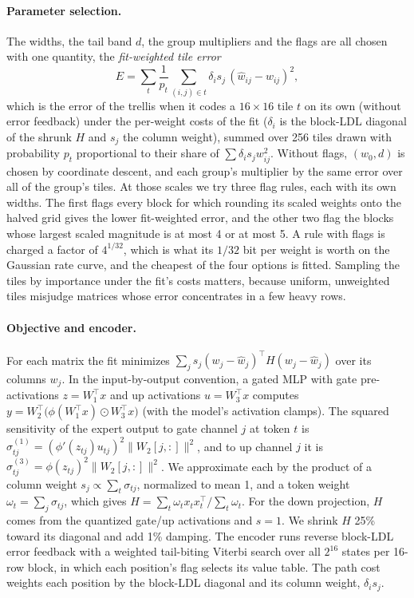 \paragraph{Parameter selection.} The widths, the tail band $d$, the group multipliers and the flags are all chosen
with one quantity, the \emph{fit-weighted tile error}
\begin{equation*}
E=\sum_{t}\frac{1}{p_t}\sum_{(i,j)\in t} \delta_i s_j\,(\hat w_{ij}-w_{ij})^2 ,
\end{equation*}
which is the error of the trellis when it codes a $16\times16$ tile $t$ on its own (without error feedback) under the
per-weight costs of the fit ($\delta_i$ is the block-LDL diagonal of the shrunk $H$ and $s_j$ the column weight),
summed over 256 tiles drawn with probability $p_t$ proportional to their share of $\sum\delta_i s_j w_{ij}^2$. Without
flags, $(w_0,d)$ is chosen by coordinate descent, and each group's multiplier by the same error over all of the
group's tiles. At those scales we try three flag rules, each with its own widths. The first flags every block for
which rounding its scaled weights onto the halved grid gives the lower fit-weighted error, and the other two flag the
blocks whose largest scaled magnitude is at most 4 or at most 5. A rule with flags is charged a factor of $4^{1/32}$,
which is what its $1/32$ bit per weight is worth on the Gaussian rate curve, and the cheapest of the four options is
fitted. Sampling the tiles by importance under the fit's costs matters, because uniform, unweighted tiles misjudge
matrices whose error concentrates in a few heavy rows.

\paragraph{Objective and encoder.} For each matrix the fit minimizes $\sum_j s_j(w_j-\hat w_j)^\top H(w_j-\hat w_j)$
over its columns $w_j$. In the input-by-output convention, a gated MLP with gate pre-activations $z=W_1^\top x$ and
up activations $u=W_3^\top x$ computes $y=W_2^\top\big(\phi(W_1^\top x)\odot W_3^\top x\big)$ (with the model's
activation clamps). The squared sensitivity of the
expert output to gate channel $j$ at token $t$ is $\sigma^{(1)}_{tj}=(\phi'(z_{tj})u_{tj})^2\|W_2[j,:]\|^2$, and to up
channel $j$ it is $\sigma^{(3)}_{tj}=\phi(z_{tj})^2\|W_2[j,:]\|^2$. We approximate each by the product of a column
weight $s_j\propto\sum_t\sigma_{tj}$, normalized to mean 1, and a token weight $\omega_t=\sum_j\sigma_{tj}$, which
gives $H=\sum_t\omega_t x_tx_t^\top/\sum_t\omega_t$. For the down projection, $H$ comes from the quantized gate/up
activations and $s=1$. We shrink $H$ 25\% toward its diagonal and add 1\% damping. The encoder runs reverse
block-LDL error feedback with a weighted tail-biting Viterbi search over all $2^{16}$ states per 16-row block, in
which each position's flag selects its value table. The path cost weights each position by the block-LDL diagonal and
its column weight, $\delta_i s_j$.

